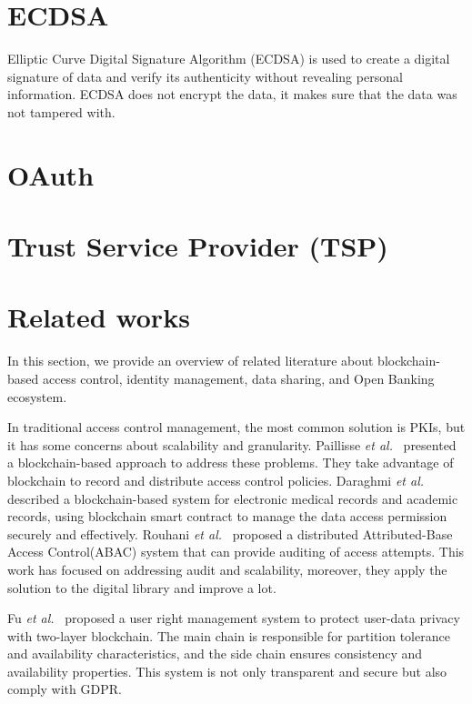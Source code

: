 \newpage

\section{ECDSA}
Elliptic Curve Digital Signature Algorithm (ECDSA) is used to create a digital signature of data and verify its authenticity without revealing personal information. ECDSA does not encrypt the data, it makes sure that the data was not tampered with.
\section{OAuth}
\newpage
\section{Trust Service Provider (TSP)}
\newpage
\section{Related works}
In this section, we provide an overview of related literature about blockchain-based access control, identity management, data sharing, and Open Banking ecosystem.\par
In traditional access control management, the most common solution is PKIs, but it has some concerns about scalability and granularity. Paillisse \emph{et al.}~\cite{paillisse2019distributed} presented a blockchain-based approach to address these problems. They take advantage of blockchain to record and distribute access control policies. Daraghmi \emph{et al.}~\cite{daraghmi2019medchain,daraghmi2019unichain} described a blockchain-based system for electronic medical records and academic records, using blockchain smart contract to manage the data access permission securely and effectively.
Rouhani \emph{et al.}~\cite{rouhani2020distributed} proposed a distributed Attributed-Base Access Control(ABAC) system that can provide auditing of access attempts. This work has focused on addressing audit and scalability, moreover, they apply the solution to the digital library and improve a lot.\par
Fu \emph{et al.}~\cite{fu2020soteria} proposed a user right management system to protect user-data privacy with two-layer blockchain. The main chain is responsible for partition tolerance and availability characteristics, and the side chain ensures consistency and availability properties. This system is not only transparent and secure but also comply with GDPR.
